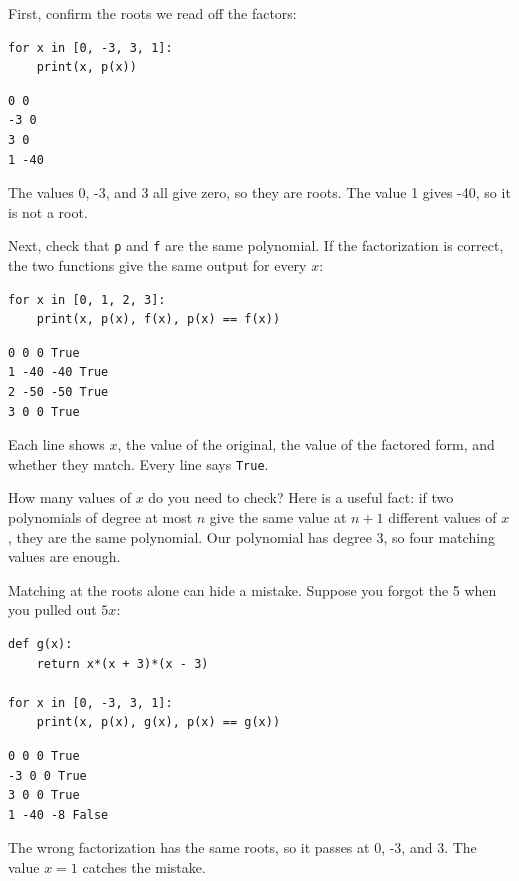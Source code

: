 First, confirm the roots we read off the factors:

\begin{verbatim}
for x in [0, -3, 3, 1]:
    print(x, p(x))
\end{verbatim}

\begin{verbatim}
0 0
-3 0
3 0
1 -40
\end{verbatim}

The values 0, -3, and 3 all give zero, so they are roots. The value 1
gives -40, so it is not a root.

Next, check that \texttt{p} and \texttt{f} are
the same polynomial. If the factorization is correct, the two functions
give the same output for every $x$:

\begin{verbatim}
for x in [0, 1, 2, 3]:
    print(x, p(x), f(x), p(x) == f(x))
\end{verbatim}

\begin{verbatim}
0 0 0 True
1 -40 -40 True
2 -50 -50 True
3 0 0 True
\end{verbatim}

Each line shows $x$, the value of the original, the value of the
factored form, and whether they match. Every line says
\texttt{True}.

How many values of $x$ do you need to check? Here is a useful fact: if
two polynomials of degree at most $n$ give the same value at $n + 1$ different
values of $x$, they are the same polynomial. Our polynomial has degree
3, so four matching values are enough.

Matching at the roots alone can hide a mistake. Suppose you forgot the 5 when
you pulled out $5x$:

\begin{verbatim}
def g(x):
    return x*(x + 3)*(x - 3)

for x in [0, -3, 3, 1]:
    print(x, p(x), g(x), p(x) == g(x))
\end{verbatim}

\begin{verbatim}
0 0 0 True
-3 0 0 True
3 0 0 True
1 -40 -8 False
\end{verbatim}

The wrong factorization has the same roots, so it passes at 0, -3, and
3. The value $x = 1$ catches the mistake.

